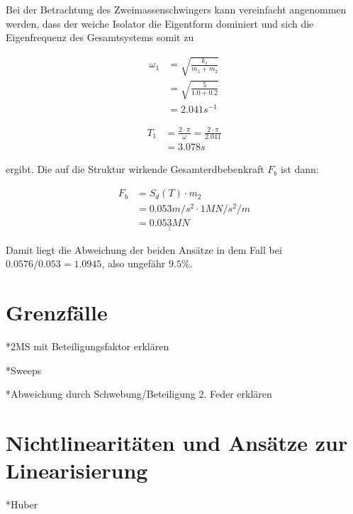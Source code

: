 Bei der Betrachtung des Zweimassenschwingers kann vereinfacht angenommen werden, dass der weiche Isolator die Eigentform dominiert \cite{AKK} und sich die Eigenfrequenz des Gesamtsystems somit zu

\begin{align*}
\omega_1 &= \sqrt{\frac{k_1}{m_1 + m_2}}\\
         &= \sqrt{\frac{5}{1.0 + 0.2}}\\
         &= 2.041 s^{-1}
\end{align*}

\begin{align*}
T_1 &= \frac{2 \cdot \pi}{\omega} = \frac{2 \cdot \pi}{2.041}\\
    &= 3.078 s
\end{align*}

ergibt. Die auf die Struktur wirkende Gesamterdbebenkraft $F_b$ ist dann:

\begin{align*}
F_b &= S_d(T) \cdot m_2\\
    &= 0.053 m/s^2 \cdot 1 MN/s^2/m\\
    &= \underline{\underline{0.053 MN}}
\end{align*}

Damit liegt die Abweichung der beiden Ansätze in dem Fall bei $0.0576/0.053=1.0945$, also ungefähr $9.5\%$.

\pagebreak

\section{Grenzfälle}
\label{sec:grenzfalle}

*2MS mit Beteiligungsfaktor erklären

*Sweeps

*Abweichung durch Schwebung/Beteiligung 2. Feder erklären

\pagebreak

\section{Nichtlinearitäten und Ansätze zur Linearisierung}
\label{sec:nichtlinearitaten}

*Huber

\pagebreak
